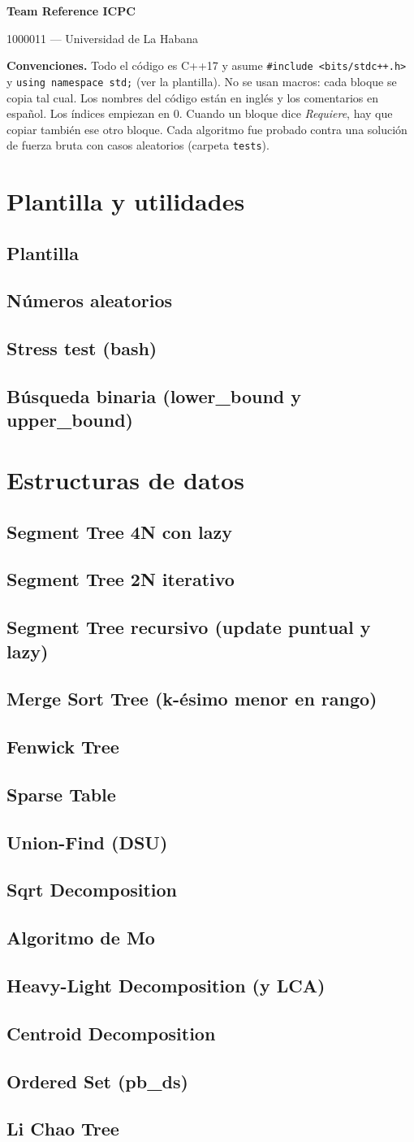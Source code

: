 \documentclass[8pt,a4paper,landscape]{extarticle}
\newcommand{\equipo}{1000011}
\newcommand{\universidad}{Universidad de La Habana}
\newcommand{\codigo}[2]{\subsection{#1}}
\begin{document}
\begin{multicols*}{2}

{\LARGE\bfseries Team Reference ICPC}\par
{\large \equipo{} --- \universidad}\par
\vspace{1ex}

\textbf{Convenciones.} Todo el c\'odigo es C++17 y asume
\texttt{\#include <bits/stdc++.h>} y \texttt{using namespace std;}
(ver la plantilla). No se usan macros: cada bloque se copia tal cual.
Los nombres del c\'odigo est\'an en ingl\'es y los comentarios en espa\~nol.
Los \'indices empiezan en 0. Cuando un bloque dice \emph{Requiere},
hay que copiar tambi\'en ese otro bloque. Cada algoritmo fue probado
contra una soluci\'on de fuerza bruta con casos aleatorios
(carpeta \texttt{tests}).

\tableofcontents

\section{Plantilla y utilidades}
\codigo{Plantilla}{varios/plantilla.cpp}
\codigo{N\'umeros aleatorios}{varios/aleatorio.cpp}
\subsection{Stress test (bash)}

\codigo{B\'usqueda binaria (lower\_bound y upper\_bound)}{varios/busqueda_binaria.cpp}

\section{Estructuras de datos}
\codigo{Segment Tree 4N con lazy}{estructuras/segtree_lazy.cpp}
\codigo{Segment Tree 2N iterativo}{estructuras/segtree_2n.cpp}
\codigo{Segment Tree recursivo (update puntual y lazy)}{estructuras/segtree_recursivo.cpp}
\codigo{Merge Sort Tree (k-\'esimo menor en rango)}{estructuras/merge_sort_tree.cpp}
\codigo{Fenwick Tree}{estructuras/fenwick.cpp}
\codigo{Sparse Table}{estructuras/sparse_table.cpp}
\codigo{Union-Find (DSU)}{estructuras/dsu.cpp}
\codigo{Sqrt Decomposition}{estructuras/sqrt_decomp.cpp}
\codigo{Algoritmo de Mo}{estructuras/mo.cpp}
\codigo{Heavy-Light Decomposition (y LCA)}{estructuras/hld.cpp}
\codigo{Centroid Decomposition}{estructuras/centroid.cpp}
\codigo{Ordered Set (pb\_ds)}{estructuras/ordered_set.cpp}
\codigo{Li Chao Tree}{estructuras/lichao.cpp}


\end{multicols*}
\end{document}
